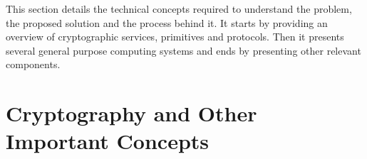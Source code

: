 \cleardoublepage
\label{chap:background}

This section details the technical concepts required to understand the problem, the proposed solution and the process behind it. It starts by providing an overview of cryptographic services, primitives and protocols. Then it presents several general purpose computing systems and ends by presenting other relevant components.

\section{Cryptography and Other Important Concepts}\label{chap:background:crypto}


